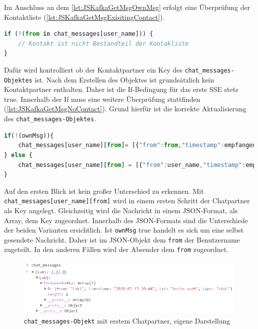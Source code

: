 \documentclass[a4paper,titlepage,halfparskip,12pt]{scrreprt}
\begin{document}
\begin{onehalfspacing}
Im Anschluss an dem \autoref{lst:JSKafkaGetMsgOwnMsg} erfolgt eine Überprüfung der Kontaktliste (\autoref{lst:JSKafkaGetMsgExisitingContact}).
\begin{lstlisting}[language=Javascript,caption=Abfrage nach der eigenen Nachricht,label={lst:JSKafkaGetMsgExisitingContact}]
if (!(from in chat_messages[user_name])) {
	// Kontakt ist nicht Bestandteil der Kontakliste
}
\end{lstlisting}
Dafür wird kontrolliert ob der Kontaktpartner ein Key des \texttt{chat\_messages-Objektes} ist. Nach dem Erstellen des Objektes ist grundsätzlich kein Kontaktpartner enthalten. Daher ist die If-Bedingung für das erste \ac{SSE} stets true. Innerhalb der If muss eine weitere Überprüfung stattfinden (\autoref{lst:JSKafkaGetMsgNoContact}). Grund hierfür ist die korrekte Aktualisierung des \texttt{chat\_messages-Objektes}.
\begin{lstlisting}[language=Javascript,caption=Weitere Ausführung in Abhängigkeit des Empfängers,label={lst:JSKafkaGetMsgNoContact}]
if(!(ownMsg)){
	chat_messages[user_name][from]= [{"from":from,"timestamp":empfangenMsg.timestamp, "txt":empfangenMsg.msg, "type": "chat"}]
} else {
	chat_messages[user_name][from] = [{"from":user_name,"timestamp":empfangenMsg.timestamp, "txt":empfangenMsg.msg, "type": "chat"}]
}
\end{lstlisting}
Auf den ersten Blick ist kein großer Unterschied zu erkennen. Mit \texttt{chat\_messages[user\_name][from]} wird in einem ersten Schritt der Chatpartner als Key angelegt. Gleichzeitig wird die Nachricht in einem JSON-Format, als Array, dem Key zugeordnet. Innerhalb des JSON-Formats sind die Unterschiede der beiden Varianten ersichtlich. Ist \texttt{ownMsg} true handelt es sich um eine selbst gesendete Nachricht. Daher ist im JSON-Objekt dem \texttt{\dq from\dq} der Benutzername zugeteilt. In den anderen Fällen wird der Absender dem \texttt{\dq from\dq} zugeordnet.
\begin{figure}[h]
	\centering
	\includegraphics[scale=1.2]{images/Chat_messageObjectFirstInsertion}
	\caption{\texttt{chat\_messages-Objekt} mit erstem Chatpartner, eigene Darstellung}
	\label{img:Chat_messageObjectFirstInsertion}
\end{figure}

\end{onehalfspacing}
\end{document}
